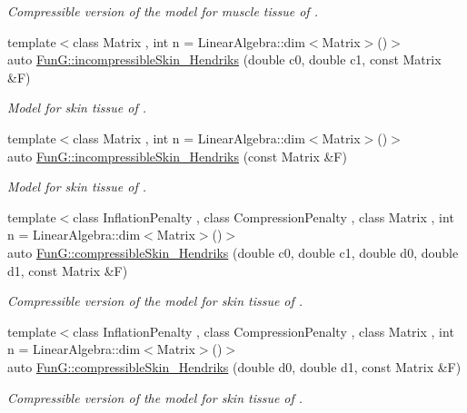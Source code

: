\begin{DoxyCompactItemize}
\begin{DoxyCompactList}\small\item\em Compressible version of the model for muscle tissue of \cite{Martins1998}. \end{DoxyCompactList}\item 
{\footnotesize template$<$class Matrix , int n = Linear\-Algebra\-::dim$<$\-Matrix$>$()$>$ }\\auto \hyperlink{group__Biomechanics_gaa20bf15ef6976d64d89490429035b2c4}{Fun\-G\-::incompressible\-Skin\-\_\-\-Hendriks} (double c0, double c1, const Matrix \&F)
\begin{DoxyCompactList}\small\item\em Model for skin tissue of \cite{Hendriks2005}. \end{DoxyCompactList}\item 
{\footnotesize template$<$class Matrix , int n = Linear\-Algebra\-::dim$<$\-Matrix$>$()$>$ }\\auto \hyperlink{group__Biomechanics_gad8653218bd2afb4e3cfd601a5142956c}{Fun\-G\-::incompressible\-Skin\-\_\-\-Hendriks} (const Matrix \&F)
\begin{DoxyCompactList}\small\item\em Model for skin tissue of \cite{Hendriks2005}. \end{DoxyCompactList}\item 
{\footnotesize template$<$class Inflation\-Penalty , class Compression\-Penalty , class Matrix , int n = Linear\-Algebra\-::dim$<$\-Matrix$>$()$>$ }\\auto \hyperlink{group__Biomechanics_ga07b4c52c6ecf7e72f73ab5832fb262cd}{Fun\-G\-::compressible\-Skin\-\_\-\-Hendriks} (double c0, double c1, double d0, double d1, const Matrix \&F)
\begin{DoxyCompactList}\small\item\em Compressible version of the model for skin tissue of \cite{Hendriks2005}. \end{DoxyCompactList}\item 
{\footnotesize template$<$class Inflation\-Penalty , class Compression\-Penalty , class Matrix , int n = Linear\-Algebra\-::dim$<$\-Matrix$>$()$>$ }\\auto \hyperlink{group__Biomechanics_ga42721e772b7eada1b0bca98247ad440f}{Fun\-G\-::compressible\-Skin\-\_\-\-Hendriks} (double d0, double d1, const Matrix \&F)
\begin{DoxyCompactList}\small\item\em Compressible version of the model for skin tissue of \cite{Hendriks2005}. \end{DoxyCompactList}\end{DoxyCompactItemize}


